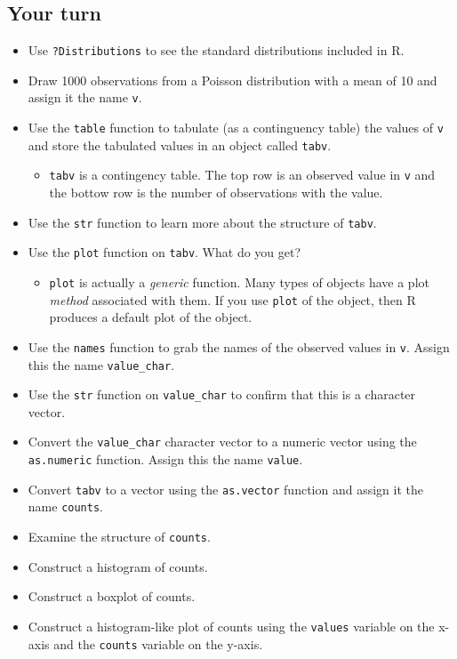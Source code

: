 \documentclass[
]{article}
\providecommand{\tightlist}{%
  \setlength{\itemsep}{0pt}\setlength{\parskip}{0pt}}
\begin{document}
\hypertarget{your-turn-10}{%
\subsection{Your turn}\label{your-turn-10}}

\begin{itemize}
\tightlist
\item
  Use \texttt{?Distributions} to see the standard distributions included
  in R.
\item
  Draw 1000 observations from a Poisson distribution with a mean of 10
  and assign it the name \texttt{v}.
\item
  Use the \texttt{table} function to tabulate (as a continguency table)
  the values of \texttt{v} and store the tabulated values in an object
  called \texttt{tabv}.

  \begin{itemize}
  \tightlist
  \item
    \texttt{tabv} is a contingency table. The top row is an observed
    value in \texttt{v} and the bottow row is the number of observations
    with the value.
  \end{itemize}
\item
  Use the \texttt{str} function to learn more about the structure of
  \texttt{tabv}.
\item
  Use the \texttt{plot} function on \texttt{tabv}. What do you get?

  \begin{itemize}
  \tightlist
  \item
    \texttt{plot} is actually a \emph{generic} function. Many types of
    objects have a plot \emph{method} associated with them. If you use
    \texttt{plot} of the object, then R produces a default plot of the
    object.
  \end{itemize}
\item
  Use the \texttt{names} function to grab the names of the observed
  values in \texttt{v}. Assign this the name \texttt{value\_char}.
\item
  Use the \texttt{str} function on \texttt{value\_char} to confirm that
  this is a character vector.
\item
  Convert the \texttt{value\_char} character vector to a numeric vector
  using the \texttt{as.numeric} function. Assign this the name
  \texttt{value}.
\item
  Convert \texttt{tabv} to a vector using the \texttt{as.vector}
  function and assign it the name \texttt{counts}.
\item
  Examine the structure of \texttt{counts}.
\item
  Construct a histogram of counts.
\item
  Construct a boxplot of counts.
\item
  Construct a histogram-like plot of counts using the \texttt{values}
  variable on the x-axis and the \texttt{counts} variable on the y-axis.
\end{itemize}
\end{document}
